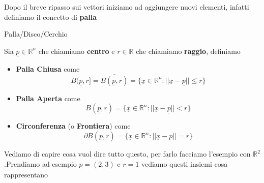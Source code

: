 \documentclass{rapport}
\begin{document}
Dopo il breve ripasso sui vettori iniziamo ad aggiungere nuovi elementi, infatti definiamo il concetto di \textbf{palla}

\begin{definizione}{Palla/Disco/Cerchio}{}

  Sia $\underline{p}\in\mathbb{R}^n$ che chiamiamo \textbf{centro} e $r\in\mathbb{R}$ che chiamiamo \textbf{raggio}, definiamo 

  \begin{itemize}
    \item \textbf{Palla Chiusa} come
    \[
    B(\underline{p}, r] = \overline{B(\underline{p}, r)} = \{\underline{x} \in \mathbb{R}^n : ||\underline{x} - \underline{p}|| \leq r\}
    \]
    \item \textbf{Palla Aperta} come
    \[
    B(\underline{p}, r) = \{\underline{x} \in \mathbb{R}^n : ||\underline{x} - \underline{p}|| < r\}
    \]

    \item \textbf{Circonferenza} (o \textbf{Frontiera}) come
    \[
    \partial B(\underline{p}, r) = \{\underline{x} \in \mathbb{R}^n : ||\underline{x} - \underline{p}|| = r\}
    \]
  \end{itemize}

\end{definizione}

Vediamo di capire cosa vuol dire tutto questo, per farlo facciamo l'esempio con $\mathbb{R}^2$.Prendiamo ad esempio $\underline{p} = (2, 3)$ e $r=1$ vediamo questi insiemi cosa rappresentano 

\vspace{0.4cm}
\end{document}
